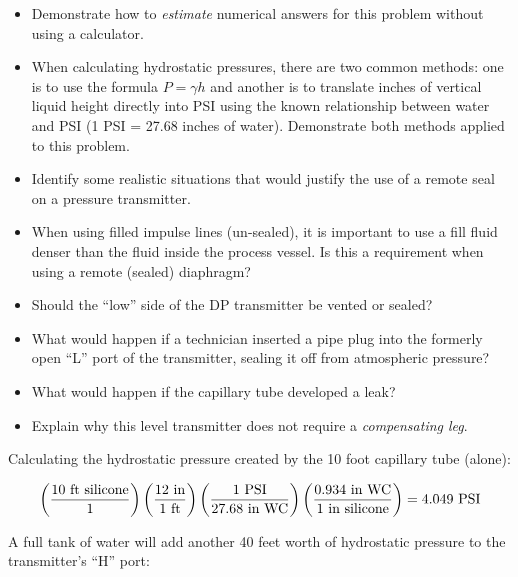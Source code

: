 \begin{itemize}
\item{} Demonstrate how to {\it estimate} numerical answers for this problem without using a calculator.
\item{} When calculating hydrostatic pressures, there are two common methods: one is to use the formula $P = \gamma h$ and another is to translate inches of vertical liquid height directly into PSI using the known relationship between water and PSI (1 PSI = 27.68 inches of water).  Demonstrate both methods applied to this problem.
\item{} Identify some realistic situations that would justify the use of a remote seal on a pressure transmitter.
\item{} When using filled impulse lines (un-sealed), it is important to use a fill fluid denser than the fluid inside the process vessel.  Is this a requirement when using a remote (sealed) diaphragm?
\item{} Should the ``low'' side of the DP transmitter be vented or sealed?
\item{} What would happen if a technician inserted a pipe plug into the formerly open ``L'' port of the transmitter, sealing it off from atmospheric pressure?
\item{} What would happen if the capillary tube developed a leak?
\item{} Explain why this level transmitter does not require a {\it compensating leg}.
\end{itemize}













Calculating the hydrostatic pressure created by the 10 foot capillary tube (alone):

$$\left(10 \hbox{ ft silicone} \over 1 \right) \left(12 \hbox{ in} \over 1 \hbox{ ft} \right) \left(1 \hbox{ PSI} \over 27.68 \hbox{ in WC} \right) \left(0.934 \hbox{ in WC} \over 1 \hbox{ in silicone} \right) = 4.049 \hbox{ PSI}$$

\vskip 10pt

A full tank of water will add another 40 feet worth of hydrostatic pressure to the transmitter's ``H'' port:

